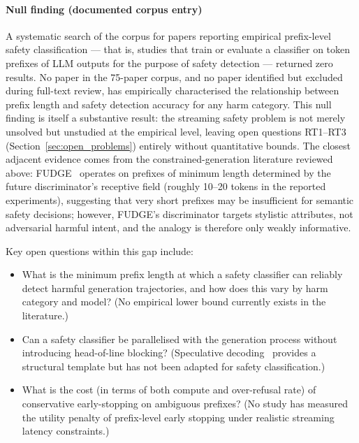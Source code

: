 \paragraph{Null finding (documented corpus entry)}
A systematic search of the corpus for papers reporting empirical prefix-level safety
classification — that is, studies that train or evaluate a classifier on token
prefixes of LLM outputs for the purpose of safety detection — returned zero results.
No paper in the 75-paper corpus, and no paper identified but excluded during
full-text review, has empirically characterised the relationship between prefix
length and safety detection accuracy for any harm category.
This null finding is itself a substantive result: the streaming safety problem is
not merely unsolved but unstudied at the empirical level, leaving open questions
RT1--RT3 (Section~\ref{sec:open_problems}) entirely without quantitative bounds.
The closest adjacent evidence comes from the constrained-generation literature
reviewed above: FUDGE~\cite{yang2021fudge} operates on prefixes of minimum length
determined by the future discriminator's receptive field (roughly 10--20 tokens
in the reported experiments), suggesting that very short prefixes may be
insufficient for semantic safety decisions; however, FUDGE's discriminator targets
stylistic attributes, not adversarial harmful intent, and the analogy is
therefore only weakly informative.

Key open questions within this gap include:

\begin{itemize}
  \item What is the minimum prefix length at which a safety classifier can reliably
        detect harmful generation trajectories, and how does this vary by harm category
        and model?
        (No empirical lower bound currently exists in the literature.)
  \item Can a safety classifier be parallelised with the generation process without
        introducing head-of-line blocking?
        (Speculative decoding~\cite{leviathan2023fast} provides a structural template
        but has not been adapted for safety classification.)
  \item What is the cost (in terms of both compute and over-refusal rate) of
        conservative early-stopping on ambiguous prefixes?
        (No study has measured the utility penalty of prefix-level early stopping
        under realistic streaming latency constraints.)
\end{itemize}

